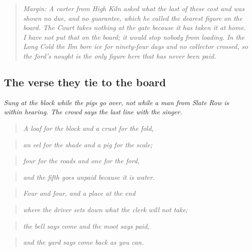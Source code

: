 \documentclass{design/chronicle}
\begin{document}
\begin{quote}\itshape \emph{Margin:} A carter from High Kiln asked what the last of these cost and was shown \emph{no due, and no guarantee}, which he called the dearest figure on the board. The Court takes nothing at the gate because it has taken it at home. I have not put that on the board; it would stop nobody from loading. In the Long Cold the Ilm bore ice for ninety-four days and no collector crossed, so the ford’s nought is the only figure here that has never been paid.\end{quote}

\subsection*{The verse they tie to the board}

\emph{Sung at the block while the pigs go over, not while a man from Slate Row is within hearing. The crowd says the last line with the singer.}

\begin{quote}\itshape A loaf for the block and a crust for the fold,\end{quote}

\begin{quote}\itshape an eel for the shade and a pig for the scale;\end{quote}

\begin{quote}\itshape four for the roads and one for the ford,\end{quote}

\begin{quote}\itshape and the fifth goes unpaid because it is water.\end{quote}

\begin{quote}\itshape \end{quote}

\begin{quote}\itshape Four and four, and a place at the end\end{quote}

\begin{quote}\itshape where the driver sets down what the clerk will not take;\end{quote}

\begin{quote}\itshape the bell says come and the moot says paid,\end{quote}

\begin{quote}\itshape and the yard says come back as you can.\end{quote}
\end{document}
